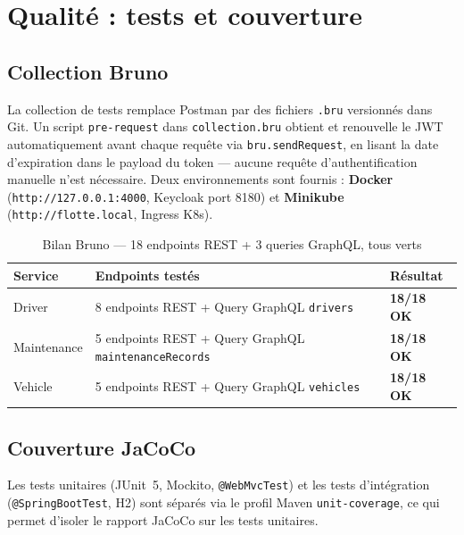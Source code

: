 \documentclass[12pt,a4paper]{article}
\begin{document}
\newpage
\section{Qualit\'{e} : tests et couverture}

\subsection{Collection Bruno}

La collection de tests remplace Postman par des fichiers \texttt{.bru} versionn\'{e}s dans Git. Un script \texttt{pre-request} dans \texttt{collection.bru} obtient et renouvelle le JWT automatiquement avant chaque requ\^{e}te via \texttt{bru.sendRequest}, en lisant la date d'expiration dans le payload du token --- aucune requ\^{e}te d'authentification manuelle n'est n\'{e}cessaire. Deux environnements sont fournis : \textbf{Docker} (\texttt{http://127.0.0.1:4000}, Keycloak port 8180) et \textbf{Minikube} (\texttt{http://flotte.local}, Ingress K8s).

\begin{table}[H]
\centering\small
\begin{tabular}{|l|l|l|}
  \hline
  \rowcolor{primary!15}
  \textbf{Service} & \textbf{Endpoints test\'{e}s} & \textbf{R\'{e}sultat} \\
  \hline
  Driver & 8 endpoints REST + Query GraphQL \texttt{drivers} & \textcolor{success}{\textbf{18/18 OK}} \\
  Maintenance & 5 endpoints REST + Query GraphQL \texttt{maintenanceRecords} & \textcolor{success}{\textbf{18/18 OK}} \\
  Vehicle & 5 endpoints REST + Query GraphQL \texttt{vehicles} & \textcolor{success}{\textbf{18/18 OK}} \\
  \hline
\end{tabular}
\caption{Bilan Bruno --- 18 endpoints REST + 3 queries GraphQL, tous verts}
\end{table}

\subsection{Couverture JaCoCo}

Les tests unitaires (JUnit~5, Mockito, \texttt{@WebMvcTest}) et les tests d'int\'{e}gration (\texttt{@SpringBootTest}, H2) sont s\'{e}par\'{e}s via le profil Maven \texttt{unit-coverage}, ce qui permet d'isoler le rapport JaCoCo sur les tests unitaires.
\end{document}
